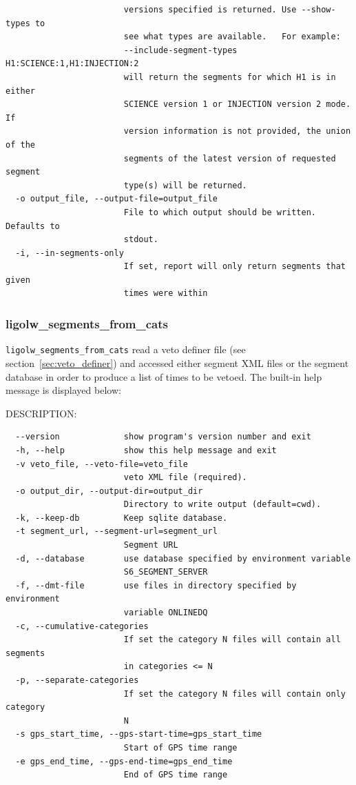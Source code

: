 {\begin{verbatim}
                        versions specified is returned. Use --show-types to
                        see what types are available.   For example:
                        --include-segment-types H1:SCIENCE:1,H1:INJECTION:2
                        will return the segments for which H1 is in either
                        SCIENCE version 1 or INJECTION version 2 mode. If
                        version information is not provided, the union of the
                        segments of the latest version of requested segment
                        type(s) will be returned.
  -o output_file, --output-file=output_file
                        File to which output should be written.  Defaults to
                        stdout.
  -i, --in-segments-only
                        If set, report will only return segments that given
                        times were within
\end{verbatim}
}



\subsubsection{ligolw\_segments\_from\_cats}
\label{ssec:from_cats}

\texttt{ligolw\_segments\_from\_cats} read a veto definer file (see
section~\ref{sec:veto_definer}) and accessed either segment XML files
or the segment database in order to produce a list of times to be
vetoed.  The built-in help message is displayed below:

DESCRIPTION:
\begin{verbatim}
  --version             show program's version number and exit
  -h, --help            show this help message and exit
  -v veto_file, --veto-file=veto_file
                        veto XML file (required).
  -o output_dir, --output-dir=output_dir
                        Directory to write output (default=cwd).
  -k, --keep-db         Keep sqlite database.
  -t segment_url, --segment-url=segment_url
                        Segment URL
  -d, --database        use database specified by environment variable
                        S6_SEGMENT_SERVER
  -f, --dmt-file        use files in directory specified by environment
                        variable ONLINEDQ
  -c, --cumulative-categories
                        If set the category N files will contain all segments
                        in categories <= N
  -p, --separate-categories
                        If set the category N files will contain only category
                        N
  -s gps_start_time, --gps-start-time=gps_start_time
                        Start of GPS time range
  -e gps_end_time, --gps-end-time=gps_end_time
                        End of GPS time range
\end{verbatim}



